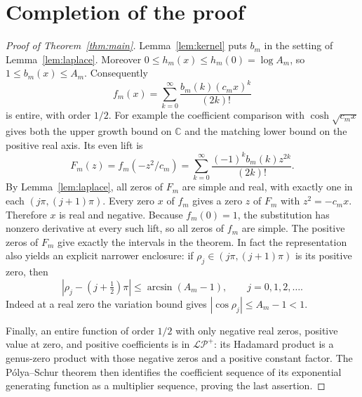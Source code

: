 \documentclass[11pt,a4paper]{article}
\newcommand{\LP}{\mathcal{LP}^{+}}
\begin{document}
\section{Completion of the proof}
\begin{proof}[Proof of Theorem~\ref{thm:main}]
Lemma~\ref{lem:kernel} puts $b_m$ in the setting of
Lemma~\ref{lem:laplace}. Moreover $0\le h_m(x)\le h_m(0)=\log A_m$,
so $1\le b_m(x)\le A_m$. Consequently
\[
f_m(x)=\sum_{k=0}^{\infty}\frac{b_m(k)(c_mx)^k}{(2k)!}
\]
is entire, with order $1/2$. For example the coefficient comparison with
$\cosh\sqrt{c_mx}$ gives both the upper growth bound on $\mathbb C$ and
the matching lower bound on the positive real axis. Its even lift is
\[
F_m(z)=f_m(-z^2/c_m)
=\sum_{k=0}^{\infty}\frac{(-1)^k b_m(k)z^{2k}}{(2k)!}.
\]
By Lemma~\ref{lem:laplace}, all zeros of $F_m$ are simple and real,
with exactly one in each $(j\pi,(j+1)\pi)$.
Every zero $x$ of $f_m$ gives a zero $z$ of $F_m$ with $z^2=-c_mx$.
Therefore $x$ is real and negative. Because $f_m(0)=1$, the substitution
has nonzero derivative at every such lift, so all zeros of $f_m$ are simple.
The positive zeros of $F_m$ give exactly the intervals in the theorem.
In fact the representation also yields an explicit narrower enclosure:
if $\rho_j\in(j\pi,(j+1)\pi)$ is its positive zero, then
\[
 \left|\rho_j-(j+\tfrac12)\pi\right|
 \le \arcsin(A_m-1),\qquad j=0,1,2,\ldots .
\]
Indeed at a real zero the variation bound gives
$|\cos\rho_j|\le A_m-1<1$.

Finally, an entire function of order $1/2$ with only negative real zeros,
positive value at zero, and positive coefficients is in $\LP$: its
Hadamard product is a genus-zero product with those negative zeros and a
positive constant factor. The P\'olya--Schur theorem then identifies the
coefficient sequence of its exponential generating function as a multiplier
sequence, proving the last assertion.
\end{proof}
\end{document}
